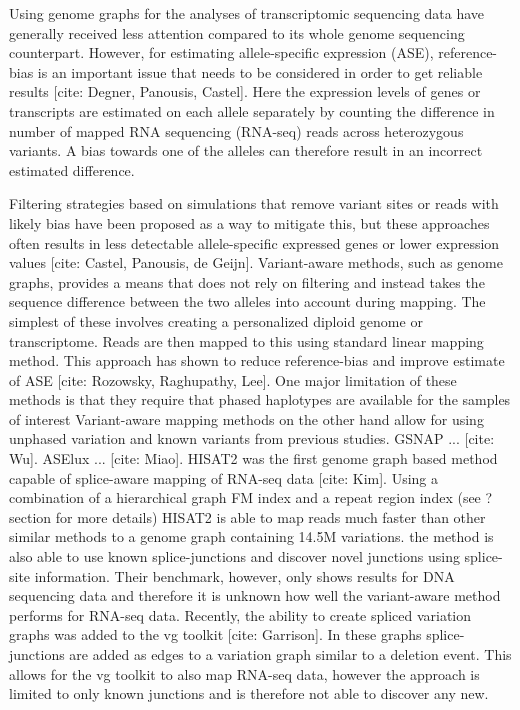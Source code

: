 Using genome graphs for the analyses of transcriptomic sequencing data have generally received less attention compared to its whole genome sequencing counterpart.
However, for estimating allele-specific expression (ASE), reference-bias is an important issue that needs to be considered in order to get reliable results [cite: Degner, Panousis, Castel].
Here the expression levels of genes or transcripts are estimated on each allele separately by counting the difference in number of mapped RNA sequencing (RNA-seq) reads across heterozygous variants.
A bias towards one of the alleles can therefore result in an incorrect estimated difference.

Filtering strategies based on simulations that remove variant sites or reads with likely bias have been proposed as a way to mitigate this, but these approaches often results in less detectable allele-specific expressed genes or lower expression values [cite: Castel, Panousis, de Geijn].
Variant-aware methods, such as genome graphs, provides a means that does not rely on filtering and instead takes the sequence difference between the two alleles into account during mapping.
The simplest of these involves creating a personalized diploid genome or transcriptome.
Reads are then mapped to this using standard linear mapping method.
This approach has shown to reduce reference-bias and improve estimate of ASE [cite: Rozowsky, Raghupathy, Lee].
One major limitation of these methods is that they require that phased haplotypes are available for the samples of interest 
Variant-aware mapping methods on the other hand allow for using unphased variation and known variants from previous studies.
GSNAP ... [cite: Wu]. 
ASElux ... [cite: Miao].
HISAT2 was the first genome graph based method capable of splice-aware mapping of RNA-seq data [cite: Kim]. 
Using a combination of a hierarchical graph FM index and a repeat region index (see ? section for more details) HISAT2 is able to map reads much faster than other similar methods to a genome graph containing 14.5M variations. 
the method is also able to use known splice-junctions and discover novel junctions using splice-site information.
Their benchmark, however, only shows results for DNA sequencing data and therefore it is unknown how well the variant-aware method performs for RNA-seq data.
Recently, the ability to create spliced variation graphs was added to the vg toolkit [cite: Garrison]. 
In these graphs splice-junctions are added as edges to a variation graph similar to a deletion event. 
This allows for the vg toolkit to also map RNA-seq data, however the approach is limited to only known junctions and is therefore not able to discover any new.

